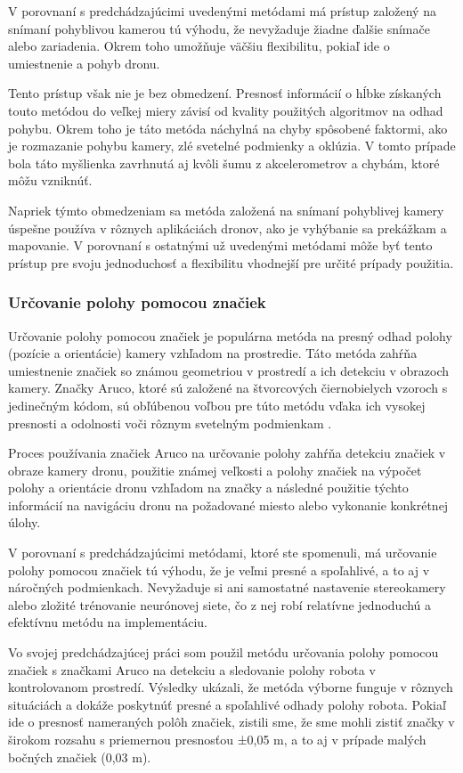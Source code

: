 V porovnaní s predchádzajúcimi uvedenými metódami má prístup založený na snímaní pohyblivou kamerou tú výhodu, že nevyžaduje žiadne ďalšie snímače alebo zariadenia. Okrem toho umožňuje väčšiu flexibilitu, pokiaľ ide o umiestnenie a pohyb dronu.

Tento prístup však nie je bez obmedzení. Presnosť informácií o hĺbke získaných touto metódou do veľkej miery závisí od kvality použitých algoritmov na odhad pohybu. Okrem toho je táto metóda náchylná na chyby spôsobené faktormi, ako je rozmazanie pohybu kamery, zlé svetelné podmienky a oklúzia. V tomto
prípade bola táto myšlienka zavrhnutá aj kvôli šumu z akcelerometrov a chybám,
ktoré môžu vzniknúť.

Napriek týmto obmedzeniam sa metóda založená na snímaní pohyblivej kamery úspešne používa v rôznych aplikáciách dronov, ako je vyhýbanie sa prekážkam a mapovanie. V porovnaní s ostatnými už uvedenými metódami môže byť tento prístup pre svoju jednoduchosť a flexibilitu vhodnejší pre určité prípady použitia.

\subsubsection{Určovanie polohy pomocou značiek}
Určovanie polohy pomocou značiek je populárna metóda na presný odhad polohy (pozície a orientácie) kamery vzhľadom na prostredie. Táto metóda zahŕňa umiestnenie značiek so známou geometriou v prostredí a ich detekciu v obrazoch kamery. Značky Aruco, ktoré sú založené na štvorcových čiernobielych vzoroch s jedinečným kódom, sú obľúbenou voľbou pre túto metódu vďaka ich vysokej presnosti a odolnosti voči rôznym svetelným podmienkam \citep{Marut2019}.

Proces používania značiek Aruco na určovanie polohy zahŕňa detekciu značiek v obraze kamery dronu, použitie známej veľkosti a polohy značiek na výpočet polohy a orientácie dronu vzhľadom na značky a následné použitie týchto informácií na navigáciu dronu na požadované miesto alebo vykonanie konkrétnej úlohy.

V porovnaní s predchádzajúcimi metódami, ktoré ste spomenuli, má určovanie polohy pomocou značiek tú výhodu, že je veľmi presné a spoľahlivé, a to aj v náročných podmienkach. Nevyžaduje si ani samostatné nastavenie stereokamery alebo zložité trénovanie neurónovej siete, čo z nej robí relatívne jednoduchú a efektívnu metódu na implementáciu. 

Vo svojej predchádzajúcej práci som použil metódu určovania polohy pomocou značiek s značkami Aruco na detekciu a sledovanie polohy robota v kontrolovanom prostredí. Výsledky ukázali, že metóda výborne funguje v rôznych situáciách a dokáže poskytnúť presné a spoľahlivé odhady polohy robota. Pokiaľ ide o presnosť nameraných polôh značiek, zistili sme, že sme mohli zistiť značky v širokom rozsahu s priemernou presnosťou ±0,05 m, a to aj v prípade malých bočných značiek (0,03 m). 

